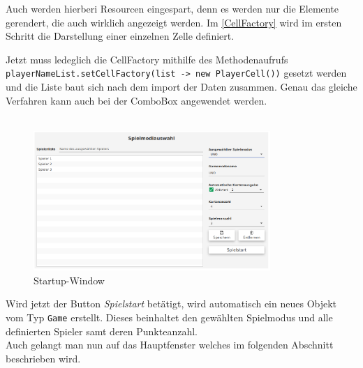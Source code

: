 Auch werden hierberi Resourcen eingespart, denn es werden nur die Elemente gerendert, die auch wirklich angezeigt werden.
Im \autoref{CellFactory} wird im ersten Schritt die Darstellung einer einzelnen Zelle definiert.

Jetzt muss ledeglich die CellFactory mithilfe des Methodenaufrufs \lstinline[style=java]{playerNameList.setCellFactory(list -> new PlayerCell())} gesetzt werden und die Liste baut sich nach dem import der Daten zusammen.
Genau das gleiche Verfahren kann auch bei der ComboBox angewendet werden.\\\\
\begin{figure}[H]
\centering
\includegraphics[width=0.8\textwidth]{fig/ainf/Startup_German.png}
\caption{Startup-Window}
\label{startupWindow}
\end{figure}
Wird jetzt der Button \textit{Spielstart} betätigt, wird automatisch ein neues Objekt vom Typ \lstinline[style=java]{Game} erstellt.
Dieses beinhaltet den gewählten Spielmodus und alle definierten Spieler samt deren Punkteanzahl.\\
Auch gelangt man nun auf das Hauptfenster welches im folgenden Abschnitt beschrieben wird.

